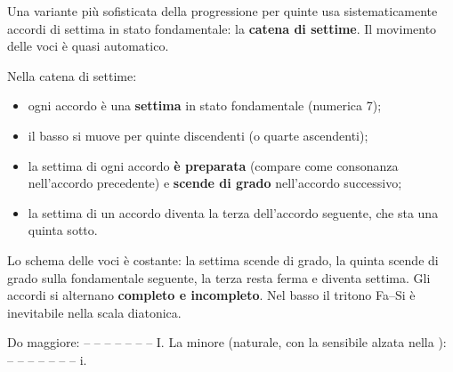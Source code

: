 Una variante più sofisticata della progressione per quinte usa sistematicamente accordi di settima in stato fondamentale: la \textbf{catena di settime}. Il movimento delle voci è quasi automatico.

\begin{regola}
	\label{reg:progressione_7}
	Nella catena di settime:
	\begin{itemize}
		\item ogni accordo è una \textbf{settima} in stato fondamentale (numerica 7);
		\item il basso si muove per quinte discendenti (o quarte ascendenti);
		\item la settima di ogni accordo \textbf{è preparata} (compare come consonanza nell'accordo precedente) e \textbf{scende di grado} nell'accordo successivo;
		\item la settima di un accordo diventa la terza dell'accordo seguente, che sta una quinta sotto.
	\end{itemize}
\end{regola}

Lo schema delle voci è costante: la settima scende di grado, la quinta scende di grado sulla fondamentale seguente, la terza resta ferma e diventa settima. Gli accordi si alternano \textbf{completo e incompleto}. Nel basso il tritono Fa--Si è inevitabile nella scala diatonica.

\begin{esempio}
	\label{ex:catena_do_la}
	Do maggiore:  --  --  --  --  --  --  -- I.
	La minore (naturale, con la sensibile alzata nella ):  --  --  --  --  --  --  -- i.
\end{esempio}
